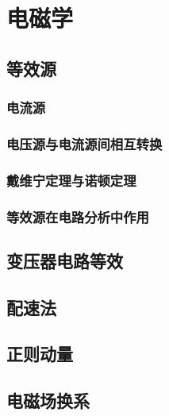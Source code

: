 
\chapter{电磁学}

\section{等效源}



\subsection{电流源}

\subsection{电压源与电流源间相互转换}

\subsection{戴维宁定理与诺顿定理}

\subsection{等效源在电路分析中作用}


\section{变压器电路等效}

\section{配速法}

\section{正则动量}

\section{电磁场换系}
